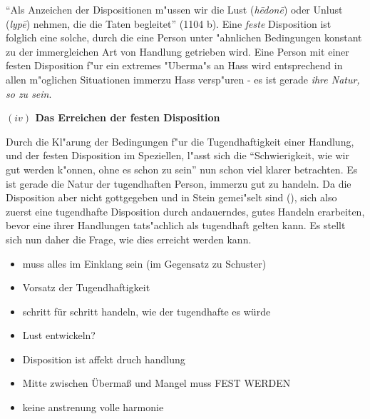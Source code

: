 \documentclass[a4paper, emulatestandardclasses, 12pt]{scrartcl}
\begin{document}
\begin{onehalfspace}
"`Als Anzeichen der Dispositionen m"ussen wir die Lust (\emph{h\={e}don\={e}}) oder Unlust (\emph{lyp\={e}}) nehmen, die die Taten begleitet"' (1104 b). Eine \emph{feste} Disposition ist folglich eine solche, durch die eine Person unter "ahnlichen Bedingungen konstant zu der immergleichen Art von Handlung getrieben wird. Eine Person mit einer festen Disposition f"ur ein extremes "Uberma"s an Hass wird entsprechend in allen m"oglichen Situationen immerzu Hass versp"uren - es ist gerade \emph{ihre Natur, so zu sein}. 

\vspace{5mm}
\noindent\textbf{$(iv)$ Das Erreichen der festen Disposition}	

\noindent Durch die Kl"arung der Bedingungen f"ur die Tugendhaftigkeit einer Handlung, und der festen Disposition im Speziellen, l"asst sich die "`Schwierigkeit, wie wir gut werden k"onnen, ohne es schon zu sein"' nun schon viel klarer betrachten. Es ist gerade die Natur der tugendhaften Person, immerzu gut zu handeln. Da die Disposition aber nicht gottgegeben und in Stein gemei"selt sind (), sich also zuerst eine tugendhafte Disposition durch andauerndes, gutes Handeln erarbeiten, bevor eine ihrer Handlungen tats"achlich als tugendhaft gelten kann. Es stellt sich nun daher die Frage, wie dies erreicht werden kann. 



\begin{itemize}
  \item muss alles im Einklang sein (im Gegensatz zu Schuster)
  \item Vorsatz der Tugendhaftigkeit
  \item schritt für schritt handeln, wie der tugendhafte es würde
  \item Lust entwickeln?
  \item Disposition ist affekt druch handlung
  \item  Mitte zwischen Übermaß und Mangel muss FEST WERDEN
  \item keine anstrenung volle harmonie
\end{itemize}


\vspace{5mm}
\vspace{3mm}

\end{onehalfspace}
\nocite{*}

\end{document}
